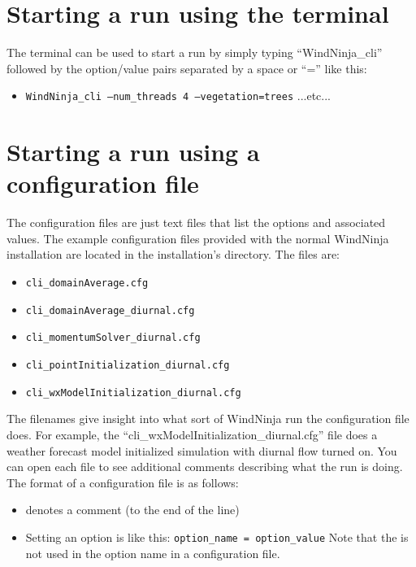 \documentclass[12pt]{article}
\begin{document}
\section*{Starting a run using the terminal}
The terminal can be used to start a run by simply typing “WindNinja\_cli” followed by the option/value pairs separated by a space or “=” like this:
\begin{itemize}
\item[] \texttt{WindNinja\_cli --num\_threads 4 --vegetation=trees} ...etc...
\end{itemize}

\section*{Starting a run using a configuration file}
The configuration files are just text files that list the options and associated values.  The example configuration files provided with the normal WindNinja installation are located in the installation's  directory.  The files are:
\begin{itemize}
\item[] \texttt{cli\_domainAverage.cfg}
\item[] \texttt{cli\_domainAverage\_diurnal.cfg}
\item[] \texttt{cli\_momentumSolver\_diurnal.cfg}
\item[] \texttt{cli\_pointInitialization\_diurnal.cfg}
\item[] \texttt{cli\_wxModelInitialization\_diurnal.cfg}
\end{itemize}

The filenames give insight into what sort of WindNinja run the configuration file does.  For example, the “cli\_wxModelInitialization\_diurnal.cfg” file does a weather forecast model initialized simulation with diurnal flow turned on.  You can open each file to see additional comments describing what the run is doing.  The format of a configuration file is as follows:
\begin{itemize}
\item \say{\texttt{\#}} denotes a comment (to the end of the line)
\item Setting an option is like this:  \texttt{option\_name  =  option\_value}\newline
Note that the \say{\texttt{--}} is not used in the option name in a configuration file.

\end{itemize}
\end{document}
